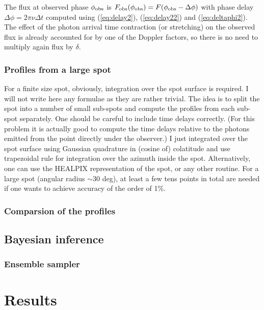 \documentclass{wihuri}
\def\phiobs{\phi_{\rm obs}}
\begin{document}
The flux at observed phase $\phiobs$ is
${F}_{\rm obs}(\phiobs)=F(\phiobs-\Delta\phi)$ with
phase delay  $\Delta \phi=2\pi\nu\Delta t$
computed using (\ref{eq:delay2}), (\ref{eq:delay22}) and (\ref{eq:deltaphi2}).
The effect of the photon arrival time contraction (or stretching) on
the observed flux is already accounted for by one of the Doppler factors, 
so there is no need to multiply again flux by $\delta$.



\subsubsection{Profiles from a large spot} 

For a finite size spot, obviously, integration over the spot surface is required. 
I will not write here any formulae as they are rather trivial. 
The idea is to split the spot into a number of small sub-spots and compute the profiles 
from each sub-spot separately. One should be careful to include time delays correctly. 
(For this problem it is actually good to compute the time delays relative to the 
photons emitted from the point directly under the observer.) 
I just  integrated over the spot surface using Gaussian quadrature in (cosine of) colatitude and 
use trapezoidal rule for integration over the azimuth inside the spot. 
Alternatively, one can use the HEALPIX representation of the spot, or any other routine. 
For a large spot (angular radius $\sim$30 deg), 
at least a few tens points in total are needed if one wants to achieve accuracy of the order of 1\%. 


\subsubsection{Comparsion of the profiles}



\subsection{Bayesian inference}

\subsubsection{Ensemble sampler}

\section{Results}
\end{document}
